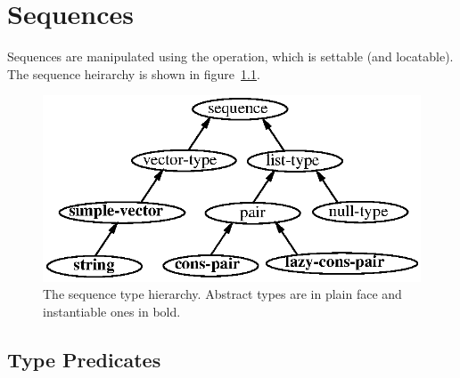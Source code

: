 %
%
%


\chapter{Sequences} \label{Sequences}

Sequences are manipulated using the  operation, which is
settable (and locatable).  The sequence heirarchy is shown in
figure~\ref{fig:seqhier}.


\begin{figure}[h]
\centering\includegraphics{seqhier}
\caption{The sequence type hierarchy.  Abstract types are in plain face
and instantiable ones in bold.} \label{fig:seqhier}
\end{figure}

\section{Type Predicates}

